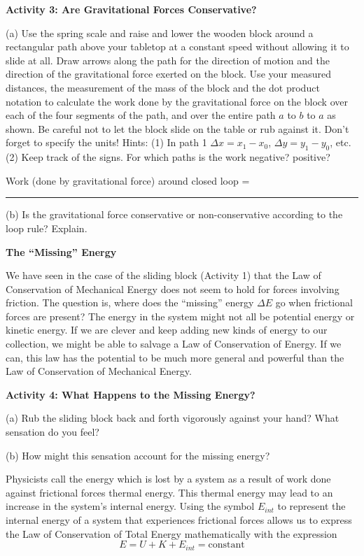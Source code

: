 \textbf{Activity 3: Are Gravitational Forces Conservative? }

(a) Use the spring scale and raise and lower the wooden block around a rectangular
path above your tabletop at a constant speed without allowing it to slide at
all. Draw arrows along the path for the direction of motion and the direction
of the gravitational force exerted on the block. Use your measured distances,
the measurement of the mass of the block and the dot product notation to calculate the work done by the gravitational force on the block over each of the four segments of the path, and over the entire path $a$ to $b$ to $a$ as shown. Be careful not to let the block slide on the table or rub against it. Don't forget to specify the units! Hints: (1) In path 1 
\( \Delta  x
= x_{1}  - x_{0} \), \( \Delta  y = y_{1}  - y_{0} \),
etc. (2) Keep track of the signs. For which paths is the work negative? positive?
\answerspace{40mm}

\hspace{1.5cm}Work (done by gravitational force) around closed loop = \rule{1.5in}{0.1pt}

\answerspace{5mm}

(b) Is the gravitational force conservative or non-conservative according to
the loop rule? Explain.
\answerspace{20mm}

\textbf{The ``Missing'' Energy} 

We have seen in the case of the sliding block (Activity 1) that the Law of Conservation of Mechanical Energy does not seem to hold for forces involving friction. The question is, where does the ``missing'' energy \( \Delta  \)$E$ go when
frictional forces are present? The energy in the system might not all be potential energy or kinetic energy. If we are clever and keep adding new kinds of energy to our collection, we might be able to salvage a Law of Conservation of Energy. If we can, this law has the potential to be much more general and powerful than the Law of Conservation of Mechanical Energy.

\pagebreak[2]
\textbf{Activity 4: What Happens to the Missing Energy?} 

(a) Rub the sliding block back and forth vigorously against your hand? What
sensation do you feel?
\vspace{10mm}

(b) How might this sensation account for the missing energy?
\vspace{20mm}

Physicists call the energy which is lost by a system as a result of work done
against frictional forces thermal energy. This thermal energy may lead to an
increase in the system's internal energy. Using the symbol \(  E_{int} \) to
represent the internal energy of a system that experiences frictional
forces allows us to express the Law of Conservation of Total Energy 
mathematically with the expression
\[
E=U+K+ E_{int}=\mbox{constant}\]


